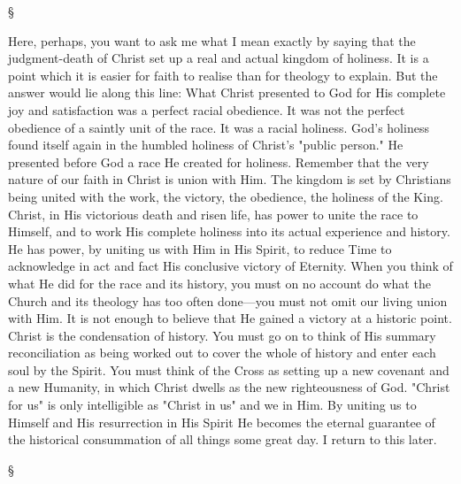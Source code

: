 \documentclass[12pt,a5paper,twoside,titlepage]{book}
\begin{document}
\begin{center}
\S
\end{center}

Here, perhaps, you want to ask me what I 
mean exactly by saying that the judgment-death 
of Christ set up a real and actual kingdom of 
holiness. It is a point which it is easier for 
faith to realise than for theology to explain. 
But the answer would lie along this line: What 
Christ presented to God for His complete joy 
and satisfaction was a perfect racial obedience. 
It was not the perfect obedience of a saintly 
unit of the race. It was a racial holiness. God's 
holiness found itself again in the humbled holiness 
of Christ's "public person." He presented 
before God a race He created for holiness. Remember 
that the very nature of our faith in 
Christ is union with Him. The kingdom is set 
by Christians being united with the work, the 
victory, the obedience, the holiness of the King. 
Christ, in His victorious death and risen life, 
has power to unite the race to Himself, and 
to work His complete holiness into its actual 
experience and history. He has power, by 
uniting us with Him in His Spirit, to reduce 
Time to acknowledge in act and fact His 
conclusive victory of Eternity. When you 
think of what He did for the race and its 
history, you must on no account do what the 
Church and its theology has too often done---you 
must not omit our living union with Him. 
It is not enough to believe that He gained a 
victory at a historic point. Christ is the 
condensation of history. You must go on to 
think of His summary reconciliation as being 
worked out to cover the whole of history and 
enter each soul by the Spirit. You must think 
of the Cross as setting up a new covenant and 
a new Humanity, in which Christ dwells as the 
new righteousness of God. "Christ for us" is 
only intelligible as "Christ in us" and we in Him. 
By uniting us to Himself and His resurrection 
in His Spirit He becomes the eternal guarantee 
of the historical consummation of all things 
some great day. I return to this later. 

\begin{center}
\S
\end{center}
\end{document}
